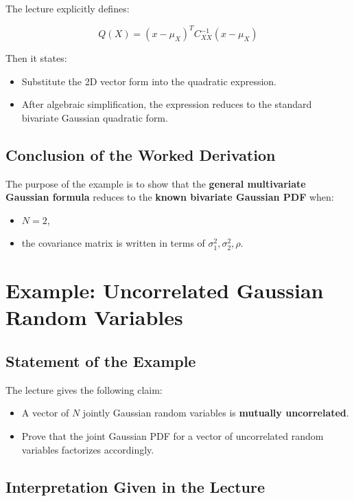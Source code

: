 \documentclass[12pt]{article}
\begin{document}
The lecture explicitly defines:

\[
Q(X) = (x-\mu_X)^T C_{XX}^{-1}(x-\mu_X)
\]

Then it states:

\begin{itemize}
    \item Substitute the 2D vector form into the quadratic expression.
    \item After algebraic simplification, the expression reduces to the standard bivariate Gaussian quadratic form.
\end{itemize}

\subsection{Conclusion of the Worked Derivation}

The purpose of the example is to show that the \textbf{general multivariate Gaussian formula} reduces to the \textbf{known bivariate Gaussian PDF} when:

\begin{itemize}
    \item \(N=2\),
    \item the covariance matrix is written in terms of \(\sigma_1^2, \sigma_2^2, \rho\).
\end{itemize}

\section{Example: Uncorrelated Gaussian Random Variables}

\subsection{Statement of the Example}

The lecture gives the following claim:

\begin{itemize}
    \item A vector of \(N\) jointly Gaussian random variables is \textbf{mutually uncorrelated}.
    \item Prove that the joint Gaussian PDF for a vector of uncorrelated random variables factorizes accordingly.
\end{itemize}

\subsection{Interpretation Given in the Lecture}
\end{document}
